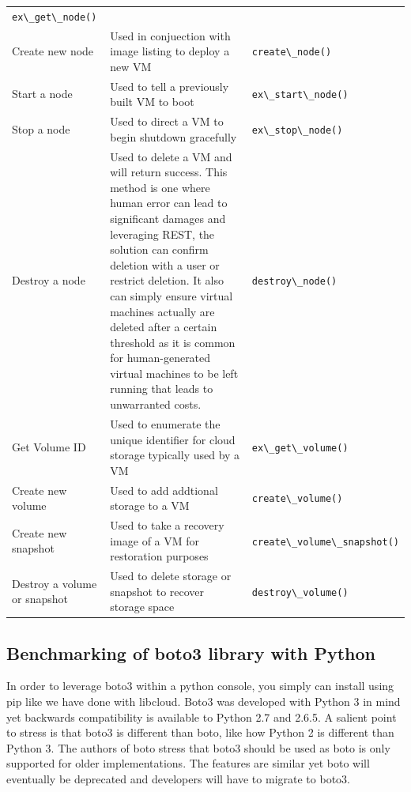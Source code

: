 \begin{table}[]
{\begin{tabular}{lll}
\verb|ex\_get\_node()|\\
 Create new node & Used in conjuection with image listing to deploy a new VM &
\verb|create\_node()|\\
 Start a node & Used to tell a previously built VM to boot &
\verb|ex\_start\_node()|\\
 Stop a node & Used to direct a VM to begin shutdown gracefully &
\verb|ex\_stop\_node()|\\
 Destroy a node & Used to delete a VM and will return success. This method is
one where human error can lead to significant damages and leveraging REST, the
solution can confirm deletion with a user or restrict deletion. It also can
simply ensure virtual machines actually are deleted after a certain threshold as
it is common for human-generated virtual machines to be left running that leads
to unwarranted costs. &
\verb|destroy\_node()|\\
 Get Volume ID & Used to enumerate the unique identifier for cloud storage
typically used by a VM & \verb|ex\_get\_volume()|\\
 Create new volume & Used to add addtional storage to a VM &
\verb|create\_volume()|\\
 Create new snapshot & Used to take a recovery image of a VM for restoration
purposes & \verb|create\_volume\_snapshot()|\\
 Destroy a volume or snapshot & Used to delete storage or snapshot to recover
storage space & \verb|destroy\_volume()|\\
  \bottomrule
 \end{tabular}%
 }
 \end{table}

\subsection{Benchmarking of boto3 library with Python}

In order to leverage boto3 within a python console, you simply can install using
pip like we have done with libcloud. Boto3 was developed with Python 3 in mind
yet backwards compatibility is available to Python 2.7 and 2.6.5. A salient
point to stress is that boto3 is different than boto, like how Python 2 is
different than Python 3. The authors of boto stress that boto3 should be used as
boto is only supported for older implementations. The features are similar yet
boto will eventually be deprecated and developers will have to migrate to
boto3.~\cite{hid-sp18-518-AWS-boto3}

